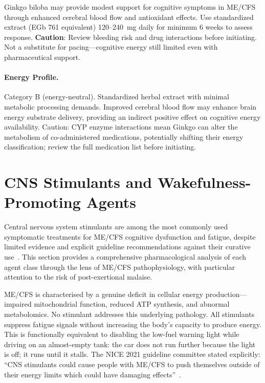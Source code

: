 \begin{keypoint}
Ginkgo biloba may provide modest support for cognitive symptoms in ME/CFS through enhanced cerebral blood flow and antioxidant effects. Use standardized extract (EGb 761 equivalent) 120--240~mg daily for minimum 6 weeks to assess response. \textbf{Caution}: Review bleeding risk and drug interactions before initiating. Not a substitute for pacing---cognitive energy still limited even with pharmaceutical support.
\end{keypoint}

\paragraph{Energy Profile.}
Category B (energy-neutral). Standardized herbal extract with minimal metabolic processing demands. Improved cerebral blood flow may enhance brain energy substrate delivery, providing an indirect positive effect on cognitive energy availability. Caution: CYP enzyme interactions mean Ginkgo can alter the metabolism of co-administered medications, potentially shifting their energy classification; review the full medication list before initiating.

\section{CNS Stimulants and Wakefulness-Promoting Agents}
\label{sec:stimulants}

Central nervous system stimulants are among the most commonly used symptomatic treatments for ME/CFS cognitive dysfunction and fatigue, despite limited evidence and explicit guideline recommendations against their curative use~\cite{NICE2021mecfs,ClinicianCoalition2021}. This section provides a comprehensive pharmacological analysis of each agent class through the lens of ME/CFS pathophysiology, with particular attention to the risk of post-exertional malaise.

\begin{warning}
\label{warn:stimulant-paradox}
ME/CFS is characterised by a genuine deficit in cellular energy production---impaired mitochondrial function, reduced ATP synthesis, and abnormal metabolomics. No stimulant addresses this underlying pathology. All stimulants suppress fatigue signals without increasing the body's capacity to produce energy. This is functionally equivalent to disabling the low-fuel warning light while driving on an almost-empty tank: the car does not run further because the light is off; it runs until it stalls. The NICE 2021 guideline committee stated explicitly: ``CNS stimulants could cause people with ME/CFS to push themselves outside of their energy limits which could have damaging effects''~\cite{NICE2021mecfs}.
\end{warning}


